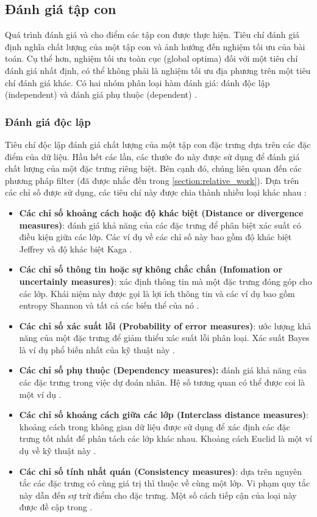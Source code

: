 \subsection{Đánh giá tập con}
Quá trình đánh giá và cho điểm các tập con được thực hiện. Tiêu chí đánh giá định nghĩa chất lượng của một tập con và ảnh hướng đến nghiệm tối ưu của bài toán. Cụ thể hơn, nghiệm tối ưu toàn cục (global optima) đối với một tiêu chí đánh giá nhất định, có thể không phải là nghiệm tối ưu địa phương trên một tiêu chí đánh giá khác. Có hai nhóm phân loại hàm đánh giá: đánh độc lập (independent) và đánh giá phụ thuộc (dependent) \cite{liu2005toward}.

\subsubsection{Đánh giá độc lập}
Tiêu chí độc lập đánh giá chất lượng của một tập con đặc trưng dựa trên các đặc điểm của dữ liệu. Hầu hết các lần, các thước đo này được sử dụng để đánh giá chất lượng của một đặc trưng riêng biệt. Bên cạnh đó, chúng liên quan đến các phương pháp filter (đã được nhắc đến trong \ref{section:relative_work}). Dựa trên các chỉ số được sử dụng, các tiêu chí này được chia thành nhiều loại khác nhau \cite{molina2002feature}:
\begin{itemize}
	\item \textbf{Các chỉ số khoảng cách hoặc độ khác biệt (Distance or divergence measures)}: đánh giá khả năng của các đặc trưng để phân biệt xác suất có điều kiện giữa các lớp. Các ví dụ về các chỉ số này bao gồm độ khác biệt Jeffrey và độ khác biệt Kaga \cite{kumar2014feature}.
	\item \textbf{Các chỉ số thông tin hoặc sự không chắc chắn (Infomation or uncertainly measures)}: xác định thông tin mà một đặc trưng đóng góp cho các lớp. Khái niệm này được gọi là lợi ích thông tin và các ví dụ bao gồm entropy Shannon và tất cả các biến thể của nó \cite{vergara2014review}.
	\item\textbf{ Các chỉ số xác suất lỗi (Probability of error measures)}: ước lượng khả năng của một đặc trưng để giảm thiểu xác suất lỗi phân loại. Xác suất Bayes là ví dụ phổ biến nhất của kỹ thuật này \cite{vehtari2002bayesian}.
	\item \textbf{Các chỉ số phụ thuộc (Dependency measures):}  đánh giá khả năng của các đặc trưng trong việc dự đoán nhãn. Hệ số tương quan có thể được coi là một ví dụ \cite{guyon2003introduction}.
	\item \textbf{Các chỉ số khoảng cách giữa các lớp (Interclass distance measures)}: khoảng cách trong không gian dữ liệu được sử dụng để xác định các đặc trưng tốt nhất để phân tách các lớp khác nhau. Khoảng cách Euclid là một ví dụ về kỹ thuật này \cite{kumar2014feature}.
	\item \textbf{Các chỉ số tính nhất quán (Consistency measures)}: dựa trên nguyên tắc các đặc trưng có cùng giá trị thì thuộc về cùng một lớp. Vi phạm quy tắc này dẫn đến sự trừ điểm cho đặc trưng. Một số cách tiếp cận của loại này được đề cập trong \cite{molina2002feature}.
\end{itemize}

